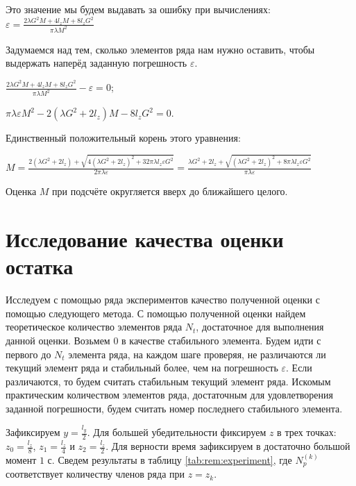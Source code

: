 Это значение мы будем выдавать за ошибку при вычислениях:\\
$\varepsilon = \frac{2 \lambda G^2 M + 4 l_z M + 8 l_z G^2}{\pi \lambda M^2}$

Задумаемся над тем, сколько элементов ряда нам нужно оставить, чтобы выдержать наперёд заданную погрешность $\varepsilon$.

$\frac{2 \lambda G^2 M + 4 l_z M + 8 l_z G^2}{\pi \lambda M^2} - \varepsilon = 0$;

$\pi \lambda \varepsilon M^2 - 2 \left( \lambda G^2 + 2 l_z \right) M - 8 l_z G^2 = 0$.

Единственный положительный корень этого уравнения:

$M = \frac{2 \left( \lambda G^2 + 2 l_z \right) + \sqrt{4 \left( \lambda G^2 + 2 l_z \right)^2 + 32 \pi \lambda l_z \varepsilon G^2}}{2 \pi \lambda \varepsilon} =
\frac{\lambda G^2 + 2 l_z + \sqrt{\left( \lambda G^2 + 2 l_z \right)^2 + 8 \pi \lambda l_z \varepsilon G^2}}{\pi \lambda \varepsilon}$

Оценка $M$ при подсчёте округляется вверх до ближайшего целого.

\section{Исследование качества оценки остатка}
Исследуем с помощью ряда экспериментов качество полученной оценки с помощью следующего метода. С помощью полученной оценки найдем
теоретическое количество элементов ряда $N_t$, достаточное для выполнения данной оценки. Возьмем $0$ в качестве стабильного элемента. 
Будем идти с первого до $N_t$ элемента ряда, на каждом шаге проверяя, не различаются ли текущий элемент ряда и стабильный более, чем
на погрешность $\varepsilon$. Если различаются, то будем считать стабильным текущий элемент ряда. Искомым практическим количеством
элементов ряда, достаточным для удовлетворения заданной погрешности, будем считать номер последнего стабильного элемента.

Зафиксируем $y = \frac{l_y}{2}$. Для большей убедительности фиксируем $z$ в трех точках: $z_0 = \frac{l_z}{8}$, $z_1 = \frac{l_z}{4}$ 
и $z_2 = \frac{l_z}{2}$. Для верности время зафиксируем в достаточно большой момент $1$ с. Сведем результаты в таблицу 
\ref{tab:rem:experiment}, где $N_{p}^{(k)}$ соответствует количеству членов ряда при $z = z_k$.

